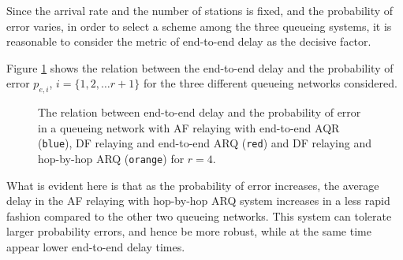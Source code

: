 Since the arrival rate and the number of stations is fixed, and the probability
of error varies, in order to select a scheme among the three queueing systems,
it is reasonable to consider the metric of end-to-end delay as the decisive
factor.

Figure \ref{fig:06_delay_1} shows the relation between the end-to-end delay
and the probability of error $p_{e,i}$, $i = \{1,2, \dots r+1\}$ for the three
different queueing networks considered.

\begin{figure}[H]\centering
  
  \caption{The relation between end-to-end delay and the probability of error
    in a queueing network with AF relaying with end-to-end AQR (\texttt{blue}),
    DF relaying and end-to-end ARQ (\texttt{red}) and
    DF relaying and hop-by-hop ARQ (\texttt{orange}) for $r=4$.}
  \label{fig:06_delay_1}
\end{figure}

What is evident here is that as the probability of error increases, the average
delay in the AF relaying with hop-by-hop ARQ system increases in a less rapid
fashion compared to the other two queueing networks. This system can tolerate
larger probability errors, and hence be more robust, while at the same time
appear lower end-to-end delay times.
